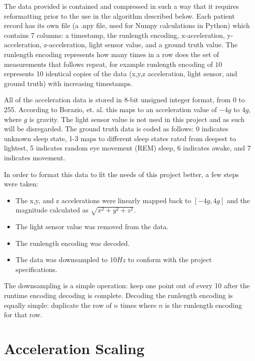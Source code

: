         The data provided is contained and compressed in such a way that it requires reformatting prior to the use in the algorithm described below. Each patient record has its own file (a .npy file, used for Numpy calculations in Python) which contains 7 columns: a timestamp, the runlength encoding, x-acceleration, y-acceleration, z-acceleration, light sensor value, and a ground truth value. The runlength encoding represents how many times in a row does the set of measurements that follows repeat, for example runlength encoding of $10$ represents 10 identical copies of the data (x,y,z acceleration, light sensor, and ground truth) with increasing timestamps. 

        All of the acceleration data is stored in 8-bit unsigned integer format, from 0 to 255. According to Borazio, et. al. this maps to an acceleration value of $-4g$ to $4g$, where $g$ is gravity. The light sensor value is not used in this project and as such will be disregarded. The ground truth data is coded as follows: 0 indicates unknown sleep state, 1-3 maps to different sleep states rated from deepest to lightest, 5 indicates random eye movement (REM) sleep, 6 indicates awake, and 7 indicates movement.

        In order to format this data to fit the needs of this project better, a few steps were taken:

        \begin{itemize}
            \item The x,y, and z accelerations were linearly mapped back to $[-4g,4g]$ and the magnitude calculated as $\sqrt{x^2 + y^2 + z^2}$.
            \item The light sensor value was removed from the data.
            \item The runlength encoding was decoded.
            \item The data was downsampled to $10Hz$ to conform with the project specifications.
        \end{itemize}

        The downsampling is a simple operation: keep one point out of every 10 after the runtime encoding decoding is complete. Decoding the runlength encoding is equally simple: duplicate the row of $n$ times where $n$ is the runlength encoding for that row.

        \section{Acceleration Scaling}

